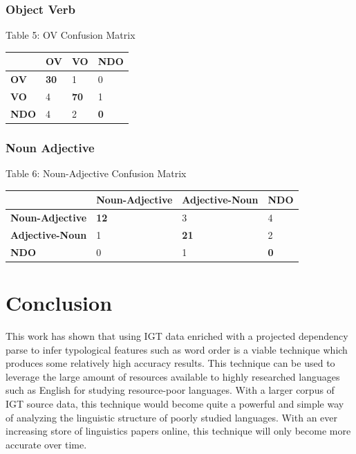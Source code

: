 \documentclass[]{article}
\begin{document}
\subsubsection{Object Verb}
\begin{center}
Table 5: OV Confusion Matrix
\end{center}
\begin{flushleft}
\begin{tabularx}{\textwidth}{|X|X|X|X|}
\hline
& \textbf{OV} & \textbf{VO} & \textbf{NDO} \\ \hline
\textbf{OV} & \textbf{30}  & 1   & 0   \\ \hline
\textbf{VO} & 4   & \textbf{70}  & 1   \\ \hline
\textbf{NDO} & 4   & 2   & \textbf{0}   \\ \hline
\end{tabularx}
\end{flushleft}
\vspace{0.6cm}

\subsubsection{Noun Adjective}
\begin{center}
Table 6: Noun-Adjective Confusion Matrix
\end{center}
\begin{flushleft}
\begin{tabularx}{\textwidth}{|X|X|X|X|}
\hline
& \textbf{Noun-Adjective} & \textbf{Adjective-Noun} & \textbf{NDO} \\ \hline
\textbf{Noun-Adjective} & \textbf{12}  & 3   & 4   \\ \hline
\textbf{Adjective-Noun} & 1   & \textbf{21}  & 2   \\ \hline
\textbf{NDO} & 0   & 1   & \textbf{0}   \\ \hline
\end{tabularx}
\end{flushleft}
\vspace{0.6cm}


\section{Conclusion}
This work has shown that using IGT data enriched with a projected dependency parse to infer typological features such as word order is a viable technique which produces some relatively high accuracy results.  This technique can be used to leverage the large amount of resources available to highly researched languages such as English for studying resource-poor languages.  With a larger corpus of IGT source data, this technique would become quite a powerful and simple way of analyzing the linguistic structure of poorly studied languages.  With an ever increasing store of linguistics papers online, this technique will only become more accurate over time.


\pagebreak



\end{document}
